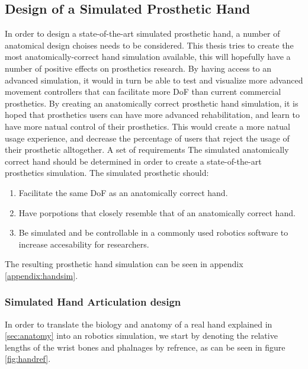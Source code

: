 \documentclass[../main.tex]{subfiles}
\begin{document}
\subsection{Design of a Simulated Prosthetic Hand}
\label{sec:prost_sim}

In order to design a state-of-the-art simulated prosthetic hand, a number of anatomical design choises needs to be considered.
This thesis tries to create the most anatomically-correct hand simulation available, this will hopefully have a number of positive effects on prosthetics research.
By having access to an advanced simulation, it would in turn be able to test and visualize more advanced movement controllers that can facilitate more DoF than current commercial prosthetics. 
By creating an anatomically correct prosthetic hand simulation, it is hoped that prosthetics users can have more advanced rehabilitation, and learn to have more natual control of their prosthetics. This would create a more natual usage experience, and decrease the percentage of users that reject the usage of their prosthetic alltogether.
A set of requirements The simulated anatomically correct hand should be determined in order to create a state-of-the-art prosthetics simulation.
The simulated prosthetic should:

\begin{enumerate}
\item Facilitate the same DoF as an anatomically correct hand.
\item Have porpotions that closely resemble that of an anatomically correct hand.
\item Be simulated and be controllable in a commonly used robotics software to increase accesability for researchers.
\end{enumerate}

The resulting prosthetic hand simulation can be seen in appendix \ref{appendix:handsim}.

\subsubsection{Simulated Hand Articulation design}

In order to translate the biology and anatomy of a real hand explained in \ref{sec:anatomy} into an robotics simulation, we start by denoting the relative lengths of the wrist bones and phalnages by refrence, as can be seen in figure \ref{fig:handref}.
\end{document}
